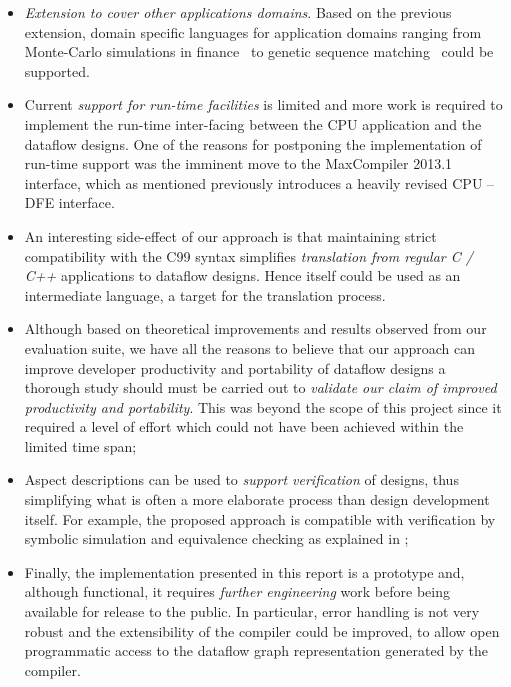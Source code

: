 \begin{itemize}
\item \emph{Extension to cover other applications domains}.  Based on
  the previous extension, domain specific languages for application
  domains ranging from Monte-Carlo simulations in
  finance~\cite{Jin:2012} to genetic sequence
  matching~\cite{Arram:2013} could be supported.

\item Current \emph{support for run-time facilities} is limited and more work
  is required to implement the run-time inter-facing between the CPU
  application and the dataflow designs. One of the reasons for
  postponing the implementation of run-time support was the imminent
  move to the MaxCompiler 2013.1 interface, which as mentioned
  previously introduces a heavily revised CPU -- DFE interface.

\item An interesting side-effect of our approach is that maintaining
  strict compatibility with the C99 syntax simplifies
  \emph{translation from regular C / C++} applications to \FAST{}
  dataflow designs. Hence \FAST{} itself could be used as an
  intermediate language, a target for the translation process.

\item Although based on theoretical improvements and results observed
  from our evaluation suite, we have all the reasons to believe that
  our approach can improve developer productivity and portability of
  dataflow designs a thorough study should must be carried out to
  \emph{validate our claim of improved productivity and
    portability}. This was beyond the scope of this project since it
  required a level of effort which could not have been achieved within the
  limited time span;

\item Aspect descriptions can be used to \emph{support verification}
  of designs, thus simplifying what is often a more elaborate process
  than design development itself. For example, the proposed approach
  is compatible with verification by symbolic simulation and
  equivalence checking as explained in \cite{todman2012verification};

\item Finally, the implementation presented in this report is a
  prototype and, although functional, it requires \emph{further
    engineering} work before being available for release to the
  public. In particular, error handling is not very robust and the
  extensibility of the compiler could be improved, to allow open
  programmatic access to the dataflow graph representation generated
  by the \fastc{} compiler.

\end{itemize}
